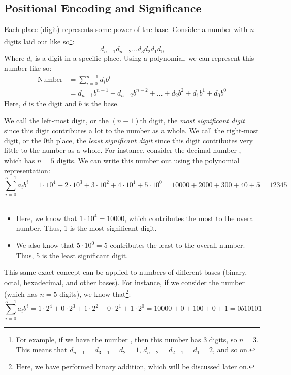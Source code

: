 \documentclass[letterpaper]{article}
\begin{document}
\subsection{Positional Encoding and Significance}
Each place (digit) represents some power of the base. Consider a number with $n$ digits laid out like so\footnote{For example, if we have the number , then this number has 3 digits, so $n = 3$. This means that $d_{n - 1} = d_{3 - 1} = d_2 = 1$, $d_{n - 2} = d_{2 - 1} = d_{1} = 2$, and so on.}:
\[d_{n - 1} d_{n - 2} \dots d_3 d_2 d_1 d_0\]
Where $d_i$ is a digit in a specific place. Using a polynomial, we can represent this number like so:
\begin{equation*}
    \begin{aligned}
        \text{Number} &= \sum_{i = 0}^{n - 1} d_i b^i \\ 
            &= d_{n - 1} b^{n - 1} + d_{n - 2} b^{n - 2} + \dots + d_2 b^2 + d_1 b^1 + d_0 b^0
    \end{aligned}
\end{equation*}
Here, $d$ is the digit and $b$ is the base. 

\bigskip 

We call the left-most digit, or the $(n - 1)$th digit, the \emph{most significant digit} since this digit contributes a lot to the number as a whole. We call the right-most digit, or the $0$th place, the \emph{least significant digit} since this digit contributes very little to the number as a whole. For instance, consider the decimal number , which has $n = 5$ digits. We can write this number out using the polynomial representation:
\[\sum_{i = 0}^{5 - 1} a_i b^i = 1 \cdot 10^4 + 2 \cdot 10^3 + 3 \cdot 10^2 + 4 \cdot 10^1 + 5 \cdot 10^0 = 10000 + 2000 + 300 + 40 + 5 = 12345\]\
\begin{itemize}
    \item Here, we know that $1 \cdot 10^4 = 10000$, which contributes the most to the overall number. Thus, 1 is the most significant digit. 
    \item We also know that $5 \cdot 10^0 = 5$ contributes the least to the overall number. Thus, 5 is the least significant digit. 
\end{itemize}

This same exact concept can be applied to numbers of different bases (binary, octal, hexadecimal, and other bases). For instance, if we consider the number  (which has $n = 5$ digits), we know that\footnote{Here, we have performed binary addition, which will be discussed later on.}:
\[\sum_{i = 0}^{5 - 1} a_i b^i = 1 \cdot 2^4 + 0 \cdot 2^3 + 1 \cdot 2^2 + 0 \cdot 2^1 + 1 \cdot 2^0 = 10000 + 0 + 100 + 0 + 1 = 0b10101\]
\end{document}
